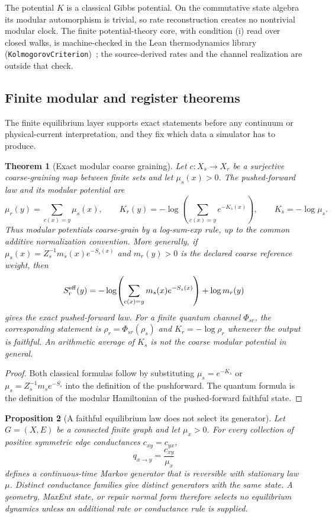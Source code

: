 \documentclass[11pt]{article}
\newtheorem{theorem}{Theorem}[section]
\newtheorem{proposition}[theorem]{Proposition}
\theoremstyle{remark}
\theoremstyle{plain}
\begin{document}
The potential \(K\) is a classical Gibbs potential. On the commutative state
algebra its modular automorphism is trivial, so rate reconstruction creates
no nontrivial modular clock. The finite potential-theory core, with
condition \textup{(i)} read over closed walks, is machine-checked in the Lean
thermodynamics library (\texttt{KolmogorovCriterion})~\cite{ophrepo}; the
source-derived rates and the channel realization are outside that check.

\subsection{Finite modular and register theorems}
\label{sec:finite-modular-register-theorems}

The finite equilibrium layer supports exact statements before any continuum
or physical-current interpretation, and they fix which data a simulator has
to produce.

\begin{theorem}[Exact modular coarse graining]
\label{thm:exact-modular-coarse-graining}
Let \(c:X_s\to X_r\) be a surjective coarse-graining map between finite sets and let
\(\mu_s(x)>0\).  The pushed-forward law and its modular potential are
\[
 \mu_r(y)=\sum_{c(x)=y}\mu_s(x),
 \qquad
 K_r(y)=-\log\!\left(\sum_{c(x)=y}e^{-K_s(x)}\right),
 \qquad K_s=-\log\mu_s .
\]
Thus modular potentials coarse-grain by a log-sum-exp rule, up to the common additive
normalization convention.  More generally, if
\(\mu_s(x)=Z_s^{-1}m_s(x)e^{-S_s(x)}\) and \(m_r(y)>0\) is the declared coarse reference
weight, then
\[
 S_r^{\rm eff}(y)
 =-\log\!\left(\sum_{c(x)=y}m_s(x)e^{-S_s(x)}\right)+\log m_r(y)
\]
gives the exact pushed-forward law.  For a finite quantum channel \(\Phi_{sr}\), the corresponding
statement is \(\rho_r=\Phi_{sr}(\rho_s)\) and \(K_r=-\log\rho_r\) whenever the output is faithful.
An arithmetic average of \(K_s\) is not the coarse modular potential in general.
\end{theorem}

\begin{proof}
Both classical formulas follow by substituting \(\mu_s=e^{-K_s}\) or
\(\mu_s=Z_s^{-1}m_se^{-S_s}\) into the definition of the pushforward.  The quantum formula is
the definition of the modular Hamiltonian of the pushed-forward faithful state.
\end{proof}

\begin{proposition}[A faithful equilibrium law does not select its generator]
\label{prop:generator-underdetermination}
Let \(G=(X,E)\) be a connected finite graph and let \(\mu_x>0\).  For every collection of
positive symmetric edge conductances \(c_{xy}=c_{yx}\),
\[
 q_{x\to y}=\frac{c_{xy}}{\mu_x}
\]
defines a continuous-time Markov generator that is reversible with stationary law \(\mu\).
Distinct conductance families give distinct generators with the same state.  A geometry,
MaxEnt state, or repair normal form therefore selects no equilibrium dynamics unless an additional
rate or conductance rule is supplied.
\end{proposition}
\end{document}
